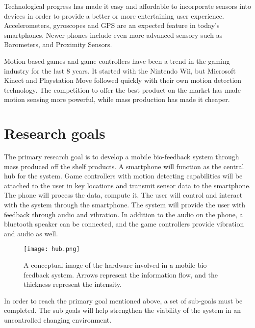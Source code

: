 Technological progress has made it easy and affordable to incorporate sensors into devices in order to provide a better or more entertaining user experience. Accelerometers, gyroscopes and GPS are an expected feature in today's smartphones. Newer phones include even more advanced sensory such as Barometers, and Proximity Sensors.

Motion based games and game controllers have been a trend in the gaming industry for the last 8 years. It started with the Nintendo Wii, but Microsoft Kinect and Playstation Move followed quickly with their own motion detection technology. The competition to offer the best product on the market has made motion sensing more powerful, while mass production has made it cheaper.

\section{Research goals}
The primary research goal is to develop a mobile bio-feedback system through mass produced off the shelf products. A smartphone will function as the central hub for the system. Game controllers with motion detecting capabilities will be attached to the user in key locations and transmit sensor data to the smartphone. The phone will process the data, compute it. The user will control and interact with the system through the smartphone. The system will provide the user with feedback through audio and vibration. In addition to the audio on the phone, a bluetooth speaker can be connected, and the game controllers provide vibration and audio as well.

\begin{figure}[h!]
  \centering
    \texttt{[image: hub.png]}
    \caption{\footnotesize A conceptual image of the hardware involved in a mobile bio-feedback system. Arrows represent the information flow, and the thickness represent the intensity.}
\end{figure}

In order to reach the primary goal mentioned above, a set of sub-goals must be completed. The sub goals will help strengthen the viability of the system in an uncontrolled changing environment.


